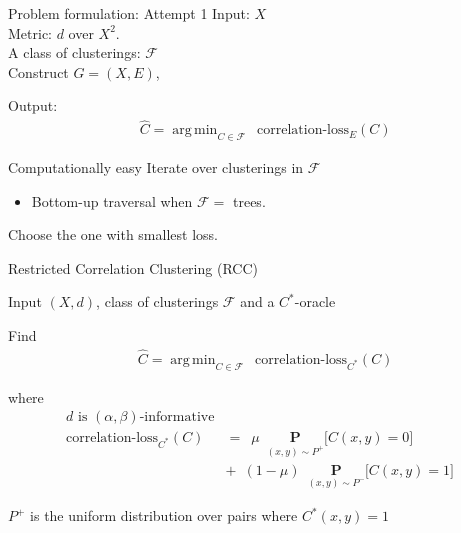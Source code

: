 \documentclass{beamer}
\newcommand{\mc}{\mathcal}
\newcommand{\mb}{\mathbf}
\DeclareMathOperator*{\argmin}{arg\,min}
\begin{document}
\begin{frame}{Problem formulation: Attempt 1}
	Input: $X$\\
	Metric: $d$ over $X^2$.\\
	A class of clusterings: $\mc F$\\
	
	\vspace{20pt}Construct $G = (X, E)$, 
	
	\vspace{10pt}Output: 
	\vspace{-10pt}\begin{align*}
	  &\hat C = \argmin_{C \in \mc F} \enspace \text{correlation-loss}_{E}(C)
	\end{align*}
\end{frame}

\begin{frame}{Computationally easy}	
	Iterate over clusterings in $\mc F$		
	\begin{itemize}
		\vspace{10pt}\item Bottom-up traversal when $\mc F = $ trees.
	\end{itemize}
	\vspace{30pt}Choose the one with smallest loss.
	
\end{frame}


\begin{frame}{Restricted Correlation Clustering (RCC)}
	\begin{block}{Input}
		$(X, d)$, class of clusterings $\mc F$ and a $C^*$-oracle
	\end{block}
	
	\vspace{10pt}\begin{block}{Find}
		\vspace{-15pt}\begin{align*}
		  &\hat C = \argmin_{C \in \mc F} \enspace \text{correlation-loss}_{C^*}(C)
		\end{align*}	
	\end{block}
	
	\begin{block}{where}
		\vspace{-20pt}\begin{align*}
			d \text{ is }(\alpha, \beta)\text{-informative}&\\
			\text{correlation-loss}_{C^*}(C) &= \enspace  \mu \enspace \underset{(x, y) \sim P^+}{\mb P} \big[ C(x, y) = 0 ] \\
			&+\enspace (1-\mu) \enspace \underset{(x, y) \sim P^-}{\mb P} \big[ C(x, y) = 1] 
		\end{align*}
	\end{block}	
	$P^+$ is the uniform distribution over pairs where $C^*(x, y) = 1$
\end{frame}
\end{document}
